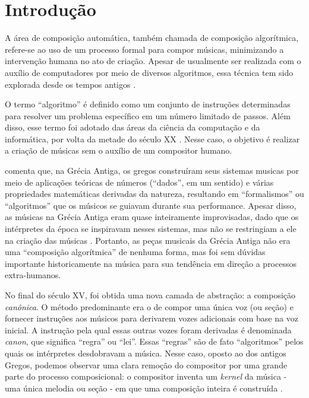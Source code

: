 \documentclass{automatextcc}
\begin{document}
\listoftables




\chapter{Introdução}

A área de composição automática, também chamada de composição algorítmica, refere-se ao uso de um processo formal para compor músicas, minimizando a intervenção humana no ato de criação. Apesar de usualmente ser realizada com o auxílio de computadores por meio de diversos algoritmos, essa técnica tem sido explorada desde os tempos antigos \citep{grout1996}.

O termo ``algoritmo'' é definido como um conjunto de instruções determinadas para resolver um problema específico em um número limitado de passos. Além disso, esse termo foi adotado das áreas da ciência da computação e da informática, por volta da metade do século XX \citep{burns1997}. Nesse caso, o objetivo é realizar a criação de músicas sem o auxílio de um compositor humano.

\cite{grout1996} comenta que, na Grécia Antiga, os gregos construíram seus sistemas musicas por meio de aplicações teóricas de números (``dados'', em um sentido) e várias propriedades matemáticas derivadas da natureza, resultando em ``formalismos'' ou ``algoritmos'' que os músicos se guiavam durante sua performance. Apesar disso, as músicas na Grécia Antiga eram quase inteiramente improvisadas, dado que os intérpretes da época se inspiravam nesses sistemas, mas não se restringiam a ele na criação das músicas \citep{grout1996}. Portanto, as peças musicais da Grécia Antiga não era uma ``composição algorítmica'' de nenhuma forma, mas foi sem dúvidas importante historicamente na música para sua tendência em direção a processos extra-humanos.

No final do século XV, foi obtida uma nova camada de abstração: a composição \textit{canônica}. O método predominante era o de compor uma única voz (ou seção) e fornecer instruções aos músicos para derivarem vozes adicionais com base na voz inicial. A instrução pela qual essas outras vozes foram derivadas é denominada \textit{canon}, que significa ``regra'' ou ``lei''. Essas ``regras'' são de fato ``algoritmos'' pelos quais os intérpretes desdobravam a música. Nesse caso, oposto ao dos antigos Gregos, podemos observar uma clara remoção do compositor por uma grande parte do processo composicional: o compositor inventa um \textit{kernel} da música - uma única melodia ou seção - em que uma composição inteira é construída \citep{grout1996}. %
\end{document}
